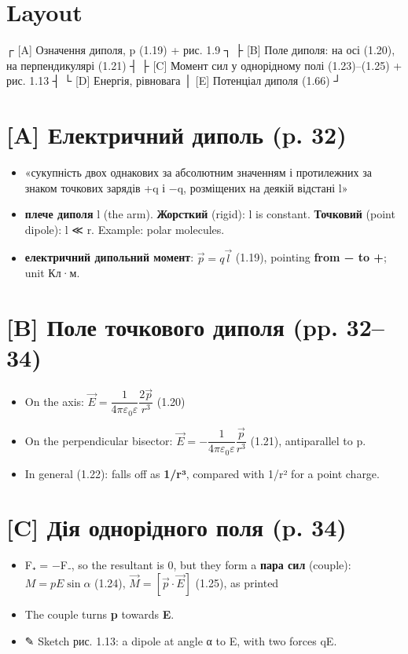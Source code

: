 \documentclass[11pt,a4paper,oneside]{book}
\newcommand{\pen}{{\sffamily\color{accent}✎}}
\begin{document}
\section*{Layout}
\begin{layout}
┌ [A] Означення диполя, p (1.19) + рис. 1.9  ┐
├ [B] Поле диполя: на осі (1.20), на перпендикулярі (1.21) ┤
├ [C] Момент сил у однорідному полі (1.23)–(1.25) + рис. 1.13 ┤
└ [D] Енергія, рівновага  │ [E] Потенціал диполя (1.66)       ┘
\end{layout}

\section*{[A] Електричний диполь (p. 32)}
\begin{itemize}
\item «сукупність двох однакових за абсолютним значенням і протилежних за знаком точкових зарядів +q і −q, розміщених на деякій відстані l»
\item \textbf{плече диполя} l (the arm). \textbf{Жорсткий} (rigid): l is constant. \textbf{Точковий} (point dipole): l ≪ r. Example: polar molecules.
\item \textbf{електричний дипольний момент}: $\vec p = q\vec l$ (1.19), pointing \textbf{from − to +}; unit Кл·м.
\end{itemize}

\section*{[B] Поле точкового диполя (pp. 32–34)}
\begin{itemize}
\item On the axis: $\vec E = \dfrac{1}{4\pi\varepsilon_0\varepsilon}\dfrac{2\vec p}{r^3}$ (1.20)
\item On the perpendicular bisector: $\vec E = -\dfrac{1}{4\pi\varepsilon_0\varepsilon}\dfrac{\vec p}{r^3}$ (1.21), antiparallel to p.
\item In general (1.22): falls off as \textbf{1/r³}, compared with 1/r² for a point charge.
\end{itemize}

\section*{[C] Дія однорідного поля (p. 34)}
\begin{itemize}
\item F₊ = −F₋, so the resultant is 0, but they form a \textbf{пара сил} (couple):
$M = pE\sin\alpha$ (1.24), $\vec M = [\vec p\cdot\vec E]$ (1.25), as printed
\item The couple turns \textbf{p} towards \textbf{E}.
\item \pen{} Sketch рис. 1.13: a dipole at angle α to E, with two forces qE.
\end{itemize}
\end{document}
